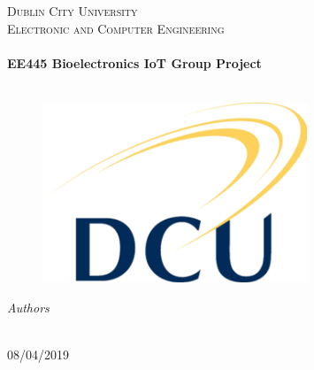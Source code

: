 \begin{titlepage}
  \begin{center}

    \textsc{\LARGE Dublin City University}\\[1.5cm]
    \textsc{\Large Electronic and Computer Engineering}\\[0.5cm]

    \HRule\\[0.4cm]
    {\huge \bfseries EE445 Bioelectronics IoT Group Project\\[0.4cm]}
    \HRule\\[1.5cm]

    \begin{figure}[H]
	\includegraphics{CoverSheet/Dcu-logo.png}
	\centering
    \end{figure}

    \vskip 3cm
    \emph{Authors}\\[0.1cm]
    \noindent{}\\[0.1cm]

    \vfill

      {\large{08/04/2019}}

  \end{center}
\end{titlepage}
